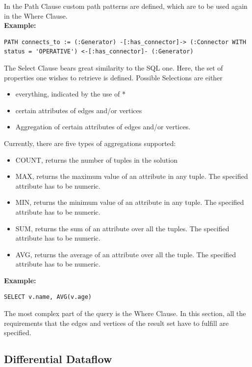 \documentclass[11pt,singlecolumn]{scrartcl}
\begin{document}
In the Path Clause custom path patterns are defined, which are to be used again in the Where Clause.\\
\textbf{Example:}\\
\begin{lstlisting}
PATH connects_to := (:Generator) -[:has_connector]-> (:Connector WITH status = 'OPERATIVE') <-[:has_connector]- (:Generator)
 \end{lstlisting}
The Select Clause bears great similarity to the SQL one. Here, the set of properties one wishes to retrieve is defined. Possible Selections are either\\
\begin{itemize} 
\item everything, indicated by the use of * 
\item certain attributes of edges and/or vertices
\item Aggregation of certain attributes of edges and/or vertices.
\end{itemize}
 Currently, there are five types of aggregations supported:\\
 \begin{itemize} 
\item COUNT, returns the number of tuples in the solution 
\item MAX, returns the maximum value of an attribute in any tuple. The specified attribute has to be numeric.
\item MIN, returns the minimum value of an attribute in any tuple. The specified attribute has to be numeric.
\item SUM, returns the sum of an attribute over all the tuples. The specified attribute has to be numeric.
\item AVG, returns the average of an attribute over all the tuple. The specified attribute has to be numeric.
\end{itemize}
\textbf{Example:}\\
\begin{lstlisting}
SELECT v.name, AVG(v.age)
 \end{lstlisting} 
The most complex part of the query is the Where Clause. In this section, all the requirements that the edges and vertices of the result set have to fulfill are specified.



 

\clearpage

\subsection{Differential Dataflow}
\end{document}
